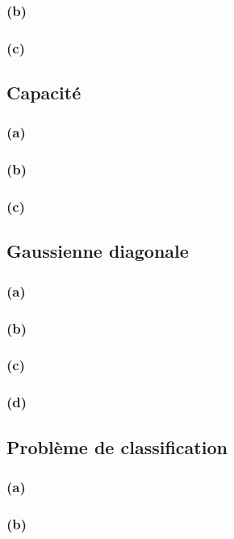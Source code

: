\documentclass{article}
\begin{document}
	\subsubsection*{(b)}
	
	\subsubsection*{(c)}
	
	
	\subsection{Capacité}
	
	\subsubsection*{(a)}
	
	\subsubsection*{(b)}
	
	\subsubsection*{(c)}
	
	
	\subsection{Gaussienne diagonale}
	
	\subsubsection*{(a)}
	
	\subsubsection*{(b)}
	
	\subsubsection*{(c)}
	
	\subsubsection*{(d)}
	
	
	\subsection{Problème de classification}
		
	\subsubsection*{(a)}
		
	\subsubsection*{(b)}
	
\end{document}
